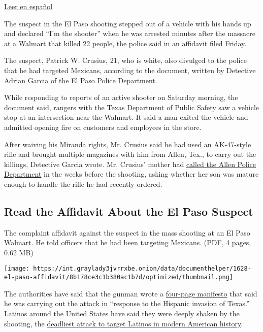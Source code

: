 \href{https://www.nytimes3xbfgragh.onion/es/2019/08/09/espanol/mundo/el-paso-sospechoso-mexicanos.html}{Leer
en español}

The suspect in the El Paso shooting stepped out of a vehicle with his
hands up and declared ``I'm the shooter'' when he was arrested minutes
after the massacre at a Walmart that killed 22 people, the police said
in an affidavit filed Friday.

The suspect, Patrick W. Crusius, 21, who is white, also divulged to the
police that he had targeted Mexicans, according to the document, written
by Detective Adrian Garcia of the El Paso Police Department.

While responding to reports of an active shooter on Saturday morning,
the document said, rangers with the Texas Department of Public Safety
saw a vehicle stop at an intersection near the Walmart. It said a man
exited the vehicle and admitted opening fire on customers and employees
in the store.

After waiving his Miranda rights, Mr. Crusius said he had used an
AK-47-style rifle and brought multiple magazines with him from Allen,
Tex., to carry out the killings, Detective Garcia wrote. Mr. Crusius'
mother had
\href{https://www.nytimes3xbfgragh.onion/2019/08/08/us/el-paso-suspect.html}{called
the Allen Police Department} in the weeks before the shooting, asking
whether her son was mature enough to handle the rifle he had recently
ordered.

\hypertarget{read-the-affidavit-about-the-el-paso-suspect}{%
\subsection{Read the Affidavit About the El Paso
Suspect}\label{read-the-affidavit-about-the-el-paso-suspect}}

The complaint affidavit against the suspect in the mass shooting at an
El Paso Walmart. He told officers that he had been targeting Mexicans.
(PDF, 4 pages, 0.62 MB)

\texttt{[image: https://int.graylady3jvrrxbe.onion/data/documenthelper/1628-el-paso-affidavit/8b178ce3c1b380ac1b7d/optimized/thumbnail.png]}

The authorities have said that the gunman wrote a
\href{https://www.nytimes3xbfgragh.onion/2019/08/03/us/patrick-crusius-el-paso-shooter-manifesto.html}{four-page
manifesto} that said he was carrying out the attack in ``response to the
Hispanic invasion of Texas.'' Latinos around the United States have said
they were deeply shaken by the shooting, the
\href{https://www.nytimes3xbfgragh.onion/2019/08/04/us/el-paso-shooting-mexico-border.html}{deadliest
attack to target Latinos in modern American history}.

